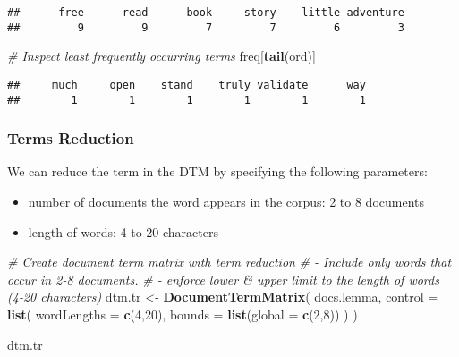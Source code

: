 \documentclass[
]{article}
\newenvironment{Shaded}{\begin{snugshade}}{\end{snugshade}}
\newcommand{\CommentTok}[1]{\textcolor[rgb]{0.56,0.35,0.01}{\textit{#1}}}
\newcommand{\DataTypeTok}[1]{\textcolor[rgb]{0.13,0.29,0.53}{#1}}
\newcommand{\DecValTok}[1]{\textcolor[rgb]{0.00,0.00,0.81}{#1}}
\newcommand{\KeywordTok}[1]{\textcolor[rgb]{0.13,0.29,0.53}{\textbf{#1}}}
\newcommand{\NormalTok}[1]{#1}
\newcommand{\StringTok}[1]{\textcolor[rgb]{0.31,0.60,0.02}{#1}}
\providecommand{\tightlist}{%
  \setlength{\itemsep}{0pt}\setlength{\parskip}{0pt}}
\begin{document}
\begin{verbatim}
##      free      read      book     story    little adventure 
##         9         9         7         7         6         3
\end{verbatim}

\begin{Shaded}
\begin{Highlighting}[]
\CommentTok{# Inspect least frequently occurring terms}
\NormalTok{freq[}\KeywordTok{tail}\NormalTok{(ord)]}
\end{Highlighting}
\end{Shaded}

\begin{verbatim}
##     much     open    stand    truly validate      way 
##        1        1        1        1        1        1
\end{verbatim}

\hypertarget{terms-reduction}{%
\subsubsection{Terms Reduction}\label{terms-reduction}}

We can reduce the term in the DTM by specifying the following
parameters:

\begin{itemize}
\tightlist
\item
  number of documents the word appears in the corpus: 2 to 8 documents
\item
  length of words: 4 to 20 characters
\end{itemize}

\begin{Shaded}
\begin{Highlighting}[]
\CommentTok{# Create document term matrix with term reduction}
\CommentTok{# - Include only words that occur in 2-8 documents. }
\CommentTok{# - enforce lower & upper limit to the length of words (4-20 characters)}
\NormalTok{dtm.tr <-}\StringTok{ }\KeywordTok{DocumentTermMatrix}\NormalTok{(}
\NormalTok{  docs.lemma, }\DataTypeTok{control =} \KeywordTok{list}\NormalTok{(}
    \DataTypeTok{wordLengths =} \KeywordTok{c}\NormalTok{(}\DecValTok{4}\NormalTok{,}\DecValTok{20}\NormalTok{), }\DataTypeTok{bounds =} \KeywordTok{list}\NormalTok{(}\DataTypeTok{global =} \KeywordTok{c}\NormalTok{(}\DecValTok{2}\NormalTok{,}\DecValTok{8}\NormalTok{))}
\NormalTok{  )}
\NormalTok{)}

\NormalTok{dtm.tr}
\end{Highlighting}
\end{Shaded}
\end{document}
